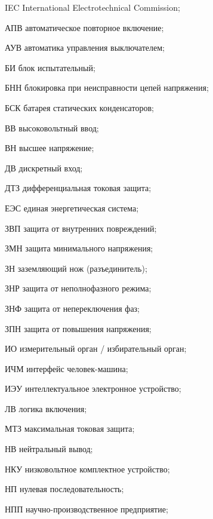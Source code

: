 \begin{list}{}%
{%
  \setlength{\labelwidth}{\abbrwidth}%
  \setlength{\labelsep}{0pt}%
  \setlength{\leftmargin}{\dimexpr\labelwidth+\labelsep\relax}%
  \setlength{\itemindent}{0pt}%
  \setlength{\parsep}{0pt}%
  \setlength{\itemsep}{0pt}
  \renewcommand{\makelabel}[1]{#1 --\hspace{\abbrgap}}%
}
\item[IEC]  International Electrotechnical Commission;
\item[АПВ] автоматическое повторное включение;
\item[АУВ] автоматика управления выключателем;
\item[БИ] блок испытательный;
\item[БНН] блокировка при неисправности цепей напряжения;
\item[БСК] батарея статических конденсаторов;
\item[ВВ] высоковольтный ввод;
\item[ВН] высшее напряжение;
\item[ДВ] дискретный вход;
\item[ДТЗ] дифференциальная токовая защита;
\item[ЕЭС] единая энергетическая система;
\item[ЗВП] защита от внутренних повреждений;
\item[ЗМН] защита минимального напряжения;
\item[ЗН] заземляющий нож (разъединитель);
\item[ЗНР] защита от неполнофазного режима;
\item[ЗНФ] защита от непереключения фаз;
\item[ЗПН] защита от повышения напряжения;
\item[ИО] измерительный орган / избирательный орган;
\item[ИЧМ] интерфейс человек-машина;
\item[ИЭУ] интеллектуальное электронное устройство;
\item[ЛВ] логика включения;
\item[МТЗ] максимальная токовая защита;
\item[НВ] нейтральный вывод;
\item[НКУ] низковольтное комплектное устройство;
\item[НП] нулевая последовательность;
\item[НПП] научно-производственное предприятие;

\end{list}

